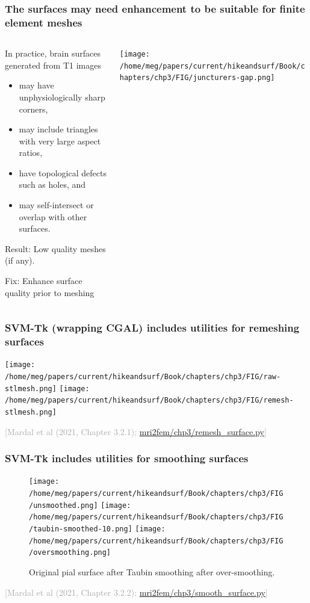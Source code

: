 \documentclass[mathserif, aspectratio=169]{beamer}
\newcommand{\refer}[1]{\begin{flushright}{\tiny \textcolor{darkgray}{[#1]}}\end{flushright}}
\begin{document}
\begin{frame}
\frametitle{The surfaces may need enhancement to be suitable for finite element meshes}

\begin{columns}
\begin{column}{0.6\textwidth}
In practice, brain surfaces generated from T1 images 
\vspace{-1em}
\begin{itemize}
\item may have unphysiologically sharp corners,   
\item may include triangles with very large aspect ratios, 
\item have topological defects such as holes, and
\item may self-intersect or overlap with other surfaces.   
\end{itemize}

\medskip

\alert{Result:} Low quality meshes (if any). \\

\medskip

\alert{Fix:} Enhance surface quality prior to meshing
\end{column}
\begin{column}{0.4\textwidth}
  \centering
  \texttt{[image: /home/meg/papers/current/hikeandsurf/Book/chapters/chp3/FIG/juncturers-gap.png]}
\end{column}

\end{columns}
\end{frame}


\begin{frame}
  \frametitle{SVM-Tk (wrapping CGAL) includes utilities for remeshing surfaces}
  \centering
  \texttt{[image: /home/meg/papers/current/hikeandsurf/Book/chapters/chp3/FIG/raw-stlmesh.png]}
  \texttt{[image: /home/meg/papers/current/hikeandsurf/Book/chapters/chp3/FIG/remesh-stlmesh.png]}
  \refer{Mardal et al (2021, Chapter 3.2.1); \href{https://github.com/kent-and/mri2fem/blob/master/mri2fem/mri2fem/chp3/remesh_surface.py}{mri2fem/chp3/remesh\_surface.py}}
\end{frame}


\begin{frame}
  \frametitle{SVM-Tk includes utilities for smoothing surfaces}
  \begin{figure}
  \centering
  \texttt{[image: /home/meg/papers/current/hikeandsurf/Book/chapters/chp3/FIG/unsmoothed.png]}
  \texttt{[image: /home/meg/papers/current/hikeandsurf/Book/chapters/chp3/FIG/taubin-smoothed-10.png]}
  \texttt{[image: /home/meg/papers/current/hikeandsurf/Book/chapters/chp3/FIG/oversmoothing.png]}

  Original pial surface \hspace{3em} after Taubin smoothing \hspace{3em}
after over-smoothing.
  \end{figure}
  \bigskip
  
  \refer{Mardal et al (2021, Chapter 3.2.2); \href{https://github.com/kent-and/mri2fem/blob/master/mri2fem/mri2fem/chp3/smooth_surface.py}{mri2fem/chp3/smooth\_surface.py}}
\end{frame}
\end{document}
